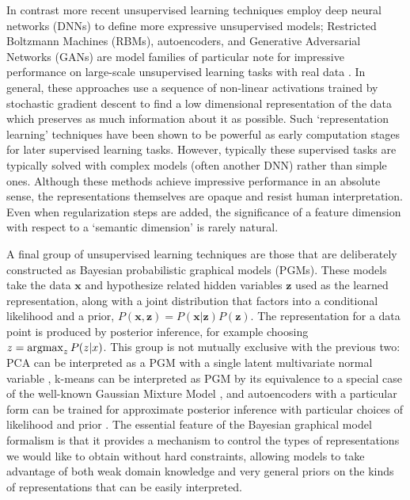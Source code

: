 In contrast  more recent unsupervised learning techniques employ deep neural networks (DNNs) to define more expressive unsupervised models; Restricted Boltzmann Machines (RBMs), autoencoders, and Generative Adversarial Networks (GANs) are model families of particular note for impressive performance on large-scale unsupervised learning tasks with real data \citep{Bengio2013,Goodfellow2014}.  In general, these approaches use a sequence of non-linear activations trained by stochastic gradient descent to find a low dimensional representation of the data which preserves as much information about it as possible. Such `representation learning' techniques have been shown to be powerful as early computation stages for later supervised learning tasks. However, typically these supervised tasks are typically solved with complex models (often another DNN) rather than simple ones. Although these methods achieve impressive performance in an absolute sense, the representations themselves are opaque and resist human interpretation. Even when regularization steps are added, the significance of a feature dimension with respect to a `semantic dimension' is rarely natural.

A final group of unsupervised learning techniques are those that are deliberately constructed as Bayesian probabilistic graphical models (PGMs). These models take the data $\textbf{x}$ and hypothesize related hidden variables $\textbf{z}$ used as the learned representation, along with a joint distribution that factors into a conditional likelihood and a prior, $P(\textbf{x}, \textbf{z}) = P(\textbf{x}|\textbf{z}) P(\textbf{z})$. The representation for a data point is produced by posterior inference, for example choosing $z = \operatorname*{argmax}_z P(z | x)$. This group is not mutually exclusive with the previous two: PCA can be interpreted as a PGM with a single latent multivariate normal variable \citep{Bishop1999}, k-means can be interpreted as PGM by its equivalence to a special case of the well-known Gaussian Mixture Model  \citep{BishopCh9}, and autoencoders with a particular form can be trained for approximate posterior inference with particular choices of likelihood and prior \citep{Kingma2014}. The essential feature of the Bayesian graphical model formalism is that it provides a mechanism to control the types of representations we would like to obtain without hard constraints, allowing models to take advantage of both weak domain knowledge and very general priors on the kinds of representations that can be easily interpreted.

